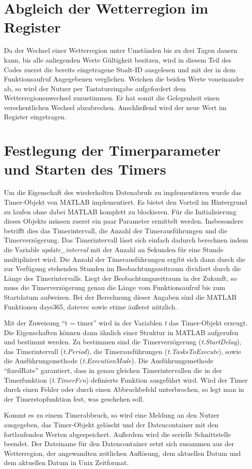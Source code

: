 \section{Abgleich der Wetterregion im Register}

Da der Wechsel einer Wetterregion unter Umständen bis zu drei Tagen dauern kann, bis alle anliegenden Werte Gültigkeit besitzen, wird in diesem Teil des Codes zuerst die bereits eingetragene Stadt-ID ausgelesen und mit der in dem Funktionsaufruf Angegebenen verglichen. Weichen die beiden Werte voneinander ab, so wird der Nutzer per Tastatureingabe aufgefordert dem Wetterregionenwechsel zuzustimmen. Er hat somit die Gelegenheit einen versehentlichen Wechsel abzubrechen. Anschließend wird der neue Wert im Register eingetragen. 
\section{Festlegung der Timerparameter und Starten des Timers}

Um die Eigenschaft des wiederholten Datenabrufs zu implementieren wurde das Timer-Objekt von MATLAB implementiert. Es bietet den Vorteil im Hintergrund zu laufen ohne dabei MATLAB komplett zu blockieren. Für die Initialisierung dieses Objekts müssen zuerst ein paar Parameter ermittelt werden. Insbesondere betrifft dies das Timerintervall, die Anzahl der Timerausführungen und die Timerverzögerung. Das Timerintervall lässt sich einfach dadurch berechnen indem die Variable \textit{update\_interval} mit der Anzahl an Sekunden für eine Stunde multipliziert wird. Die Anzahl der Timerausführungen ergibt sich dann durch die zur Verfügung stehenden Stunden im Beobachtungszeitraum dividiert durch die Länge des Timerintervalls. Liegt der Beobachtungszeitraum in der Zukunft, so muss die Timerverzögerung genau die Länge vom Funktionsaufruf bis zum Startdatum aufweisen. Bei der Berechnung dieser Angaben sind die MATLAB Funktionen \textsf{days365}, \textsf{datevec} sowie \textsf{etime} äußerst nützlich.
    
Mit der Zuweisung \enquote{t = timer} wird in der Variablen \textit{t} das Timer-Objekt erzeugt. Die Eigenschaften können dann ähnlich einer Struktur in MATLAB aufgerufen und bestimmt werden. Zu bestimmen sind die Timerverzögerung (\textit{t.StartDelay}), das Timerintervall (\textit{t.Period}), die Timerausführungen (\textit{t.TasksToExecute}), sowie die Ausführungsmethode (\textit{t.ExecutionMode}). Die Ausführungsmethode \enquote{fixedRate} garantiert, dass in genau gleichen Timerintervallen die in der Timerfunktion (\textit{t.TimerFcn}) definierte Funktion ausgeführt wird. Wird der Timer durch einen Fehler oder durch einen Abbruchbefehl unterbrochen, so legt man in der Timerstopfunktion fest, was geschehen soll.
  
Kommt es zu einem Timerabbruch, so wird eine Meldung an den Nutzer ausgegeben, das Timer-Objekt gelöscht und der Datencontainer mit den fortlaufenden Werten abgespeichert. Außerdem wird die serielle Schnittstelle beendet. Der Dateiname für den Datencontainer setzt sich zusammen aus der Wetterregion, der angewandten zeitlichen Auflösung, dem aktuellen Datum und dem aktuellen Datum in Unix Zeitformat.    
